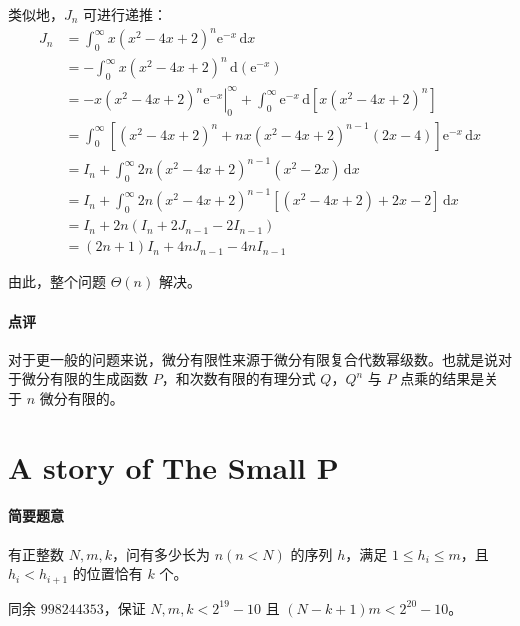 \documentclass[12pt]{ctexart}
\newcommand{\di}{\ensuremath{\mathrm{\,d}}}
\newcommand{\me}{\ensuremath{\mathrm e}}
\theoremstyle{theorem}
\theoremstyle{theorem}
\begin{document}
类似地，$J_n$ 可进行递推：
\begin{align*}
J_n &= \int_0^\infty x(x^2-4x+2)^n \me^{-x} \di x\\
 &= -\int_0^\infty x(x^2-4x+2)^n \di (\me^{-x})\\
  &= \left. -x(x^2-4x+2)^n \me^{-x} \right |_0^\infty + \int_0^\infty \me^{-x} \di \left[ x(x^2-4x+2)^n \right]\\
   &= \int_0^\infty \left[ (x^2-4x+2)^n + nx(x^2-4x+2)^{n-1}(2x-4) \right]\me^{-x} \di x\\
   &= I_n + \int_0^\infty 2n(x^2-4x+2)^{n-1}(x^2-2x)\di x\\
   &= I_n + \int_0^\infty 2n(x^2-4x+2)^{n-1}[(x^2-4x+2)+2x-2]\di x\\
   &= I_n + 2n (I_n + 2J_{n-1} - 2I_{n-1})\\
   &= (2n+1) I_n + 4nJ_{n-1} - 4nI_{n-1}
\end{align*}

由此，整个问题 $\Theta(n)$ 解决。

\paragraph{点评} 对于更一般的问题来说，微分有限性来源于微分有限复合代数幂级数。也就是说对于微分有限的生成函数 $P$，和次数有限的有理分式 $Q$，$Q^n$ 与 $P$ 点乘的结果是关于 $n$ 微分有限的。

\newpage

\section{A story of The Small P}

\paragraph{简要题意} 有正整数 $N,m,k$，问有多少长为 $n(n<N)$ 的序列 $h$，满足 $1\le h_i\le m$，且 $h_i<h_{i+1}$ 的位置恰有 $k$ 个。

同余 $998244353$，保证 $N,m,k<2^{19}-10$ 且 $(N-k+1)m<2^{20}-10$。
\end{document}
